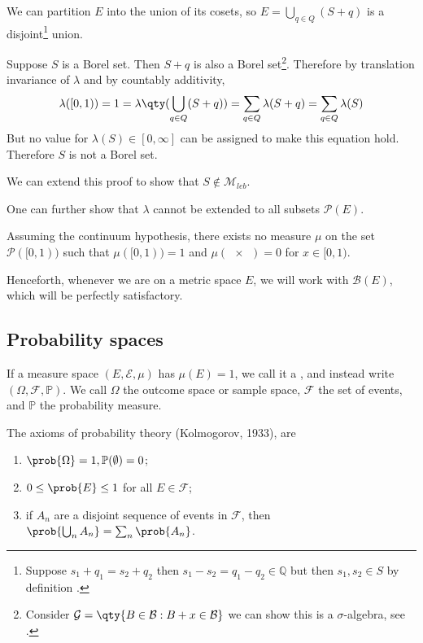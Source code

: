 We can partition $E$ into the union of its cosets, so $E = \bigcup_{q \in Q} (S + q)$ is a disjoint\footnote{Suppose $s_1 + q_1 = s_2 + q_2$ then $s_1 - s_2 = q_1 - q_2 \in \mathbb{Q}$ but then $s_1, s_2 \in S$ by definition \Lightning.} union.

Suppose $S$ is a Borel set.
Then $S + q$ is also a Borel set\footnote{Consider $\mathcal{G} = \qty{B \in \mathcal{B} : B + x \in \mathcal{B}}$ we can show this is a $\sigma$-algebra, see .}.
Therefore by translation invariance of $\lambda$ and by countably additivity,
\begin{align*}
	\lambda([0, 1)) = 1 = \lambda\qty(\bigcup_{q \in Q}(S+q)) = \sum_{q \in Q} \lambda(S+q) = \sum_{q \in Q} \lambda(S)
\end{align*}
But no value for $\lambda(S) \in [0,\infty]$ can be assigned to make this equation hold.
Therefore $S$ is not a Borel set.

\begin{remark}
	We can extend this proof to show that $S \notin \mathcal{M}_{leb}$.
\end{remark}

One can further show that $\lambda$ cannot be extended to all subsets $\mathcal P(E)$.
\begin{theorem}
	Assuming the continuum hypothesis, there exists no measure $\mu$ on the set $\mathcal P([0,1))$ such that $\mu([0,1)) = 1$ and $\mu(\qty{x}) = 0$ for $x \in [0,1)$.
\end{theorem}

Henceforth, whenever we are on a metric space $E$, we will work with $\mathcal{B}(E)$, which will be perfectly satisfactory.

\subsection{Probability spaces}

\begin{definition}
	If a measure space $(E, \mathcal E, \mu)$ has $\mu(E) = 1$, we call it a , and instead write $(\Omega, \mathcal F, \mathbb P)$.
	We call $\Omega$ the outcome space or sample space, $\mathcal F$ the set of events, and $\mathbb P$ the probability measure.
\end{definition}

The axioms of probability theory (Kolmogorov, 1933), are

\begin{enumerate}
	\item $\prob{\Omega} = 1, \mathbb{P}(\emptyset) = 0$;
	\item $0 \leq \prob{E} \leq 1$ for all $E \in \mathcal F$;
	\item if $A_n$ are a disjoint sequence of events in $\mathcal F$, then $\prob{\bigcup_n A_n} = \sum_n \prob{A_n}$.
\end{enumerate}

